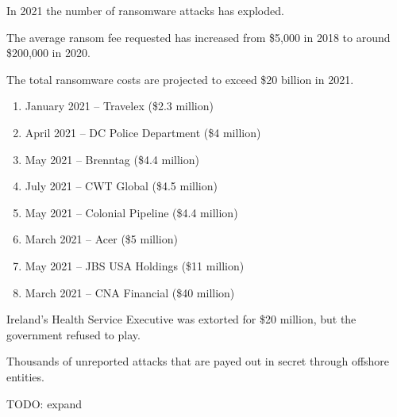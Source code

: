 In 2021 the number of ransomware attacks has exploded.

The average ransom fee requested has increased from \$5,000 in 2018 to around \$200,000 in 2020.

The total ransomware costs are projected to exceed \$20 billion in 2021.

\begin{enumerate}
  \item January 2021 -- Travelex (\$2.3 million)
  \item April 2021 -- DC Police Department (\$4 million)
  \item May 2021 -- Brenntag (\$4.4 million)
  \item July 2021 -- CWT Global (\$4.5 million)
  \item May 2021 -- Colonial Pipeline (\$4.4 million)
  \item March 2021 -- Acer (\$5 million)
  \item May 2021 -- JBS USA Holdings (\$11 million)
  \item March 2021 -- CNA Financial (\$40 million)
\end{enumerate}

Ireland’s Health Service Executive was extorted for \$20 million, but the
government refused to play.

Thousands of unreported attacks that are payed out in secret through offshore
entities.


TODO: expand
